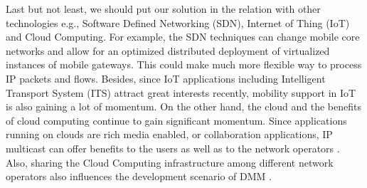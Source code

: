 Last but not least, we should put our solution in the relation with other technologies e.g., Software Defined Networking (SDN),  Internet of Thing (IoT) and Cloud Computing. For example, the SDN techniques can change mobile core networks and allow for an optimized distributed deployment of virtualized instances of mobile gateways. This could make much more flexible way to process IP packets and flows.  Besides, since IoT applications including Intelligent Transport System (ITS) attract great interests recently, mobility support in IoT is also gaining a lot of momentum. On the other hand, the cloud and the benefits of cloud computing continue to gain significant momentum. Since applications running on clouds are rich media enabled, or collaboration applications, IP multicast can offer benefits to the users as well as to the network operators \cite{cloud_multicast}. Also, sharing the Cloud Computing infrastructure among different network operators also influences the development scenario of DMM \cite{cloud_dmm}.








